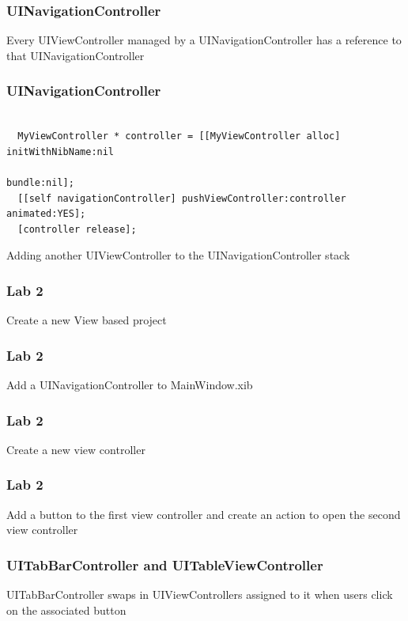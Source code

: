 \documentclass[10pt]{beamer}
\begin{document}
\begin{frame}[fragile]
  \frametitle{UINavigationController}
  Every UIViewController managed by a UINavigationController has a reference to that UINavigationController

\end{frame}

\begin{frame}[fragile]
  \frametitle{UINavigationController}
  \begin{listing}[H]
    \begin{verbatim}

  MyViewController * controller = [[MyViewController alloc] initWithNibName:nil
                                                            bundle:nil];
  [[self navigationController] pushViewController:controller animated:YES];
  [controller release];

  \end{verbatim}
    \caption{Adding another UIViewController to the UINavigationController stack}
    \label{listing:25}
  \end{listing}

\end{frame}

    
\begin{frame}[fragile]
  \frametitle{Lab 2}
  Create a new View based project

\end{frame}

\begin{frame}[fragile]
  \frametitle{Lab 2}
  Add a UINavigationController to MainWindow.xib

\end{frame}

\begin{frame}[fragile]
  \frametitle{Lab 2}
  Create a new view controller

\end{frame}

\begin{frame}[fragile]
  \frametitle{Lab 2}
  Add a button to the first view controller and create an action to open the second view controller

\end{frame}

    
\begin{frame}[fragile]
  \frametitle{UITabBarController and UITableViewController}
  UITabBarController swaps in UIViewControllers assigned to it when users click on the associated button

\end{frame}
\end{document}
